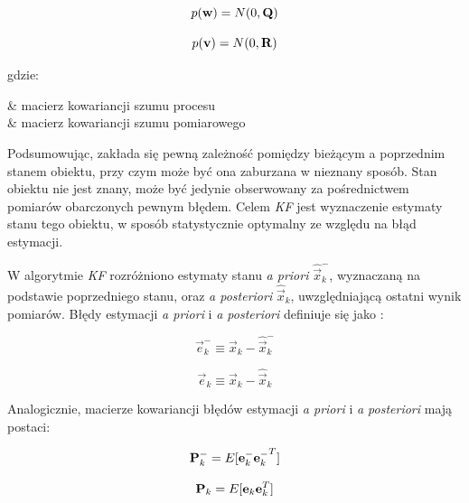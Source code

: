 \begin{equation}
\label{equ:Filtr_Kalmana_szum_procesu}
	p(\mathbf{w}) = N(0, \mathbf{Q})
\end{equation}

\begin{equation}
\label{equ:Filtr_Kalmana_szum_pomiaru}
	p(\mathbf{v}) = N(0, \mathbf{R})
\end{equation}

\noindent
gdzie:

\begin{conditions}
	 & macierz kowariancji szumu procesu \\
	 & macierz kowariancji szumu pomiarowego \\
\end{conditions}

Podsumowując, zakłada się pewną zależność pomiędzy bieżącym a poprzednim stanem obiektu, przy czym może być ona zaburzana w nieznany sposób. Stan obiektu nie jest znany, może być jedynie obserwowany za pośrednictwem pomiarów obarczonych pewnym błędem. Celem \textit{KF} jest wyznaczenie estymaty stanu tego obiektu, w sposób statystycznie optymalny ze względu na błąd estymacji.

W algorytmie \textit{KF} rozróżniono estymaty stanu \textit{a priori} $\hat{\vec{x}}_k^-$, wyznaczaną na podstawie poprzedniego stanu, oraz \textit{a posteriori} $\hat{\vec{x}}_k$, uwzględniającą ostatni wynik pomiarów. Błędy estymacji \textit{a priori} i \textit{a posteriori} definiuje się jako \cite{Welch1995}:

\begin{equation}
\label{equ:Filtr_Kalmana_blad_a_priori}
	\vec{e}_k^- \equiv \vec{x}_k - \hat{\vec{x}}_k^-
\end{equation}

\begin{equation}
\label{equ:Filtr_Kalmana_a_posteriori}
	\vec{e}_k \equiv \vec{x}_k - \hat{\vec{x}}_k
\end{equation}

Analogicznie, macierze kowariancji błędów estymacji \textit{a priori} i \textit{a posteriori} mają postaci:

\begin{equation}
\label{equ:Filtr_Kalmana_macierz_kowariancji_a_priori}
	\mathbf{P}_k^- = E[\mathbf{e}_k^- {\mathbf{e}_k^-}^T]
\end{equation}

\begin{equation}
\label{equ:Filtr_Kalmana_macierz_kowariancji_a_posteriori}
	\mathbf{P}_k = E[\mathbf{e}_k \mathbf{e}_k^T]
\end{equation}

